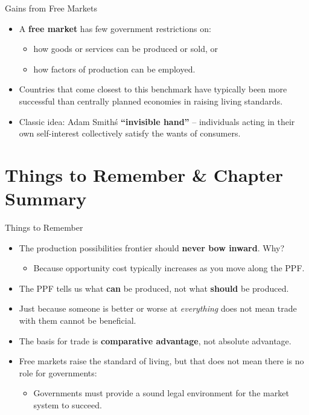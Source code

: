 \documentclass[aspectratio=169]{beamer}
\begin{document}
\begin{frame}{Gains from Free Markets}
\transfade
\begin{itemize}
  \item A \textbf{free market} has few government restrictions on:
  \begin{itemize}
    \item how goods or services can be produced or sold, or
    \item how factors of production can be employed.
  \end{itemize}
  \item Countries that come closest to this benchmark have typically been more successful than centrally planned economies in raising living standards.
  \item Classic idea: Adam Smith\'s \textbf{``invisible hand''} -- individuals acting in their own self-interest collectively satisfy the wants of consumers.
\end{itemize}
\end{frame}

\section{Things to Remember \& Chapter Summary}

\begin{frame}{Things to Remember}
\transfade
\begin{itemize}
  \item The production possibilities frontier should \textbf{never bow inward}. Why?
    \begin{itemize}
      \item Because opportunity cost typically increases as you move along the PPF.
    \end{itemize}
  \item The PPF tells us what \textbf{can} be produced, not what \textbf{should} be produced.
  \item Just because someone is better or worse at \emph{everything} does not mean trade with them cannot be beneficial.
  \item The basis for trade is \textbf{comparative advantage}, not absolute advantage.
  \item Free markets raise the standard of living, but that does not mean there is no role for governments:
    \begin{itemize}
      \item Governments must provide a sound legal environment for the market system to succeed.
    \end{itemize}
\end{itemize}
\end{frame}
\end{document}
